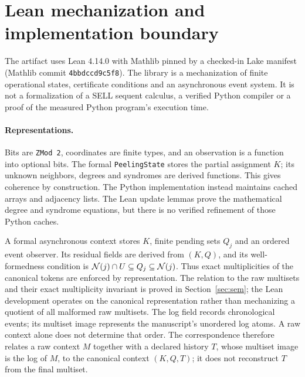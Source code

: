 \section{Lean mechanization and implementation boundary}\label{sec:lean}
The artifact uses Lean 4.14.0 with Mathlib pinned by a checked-in Lake
manifest (Mathlib commit \texttt{4bbdccd9c5f8}). The library is a
mechanization of finite operational states, certificate conditions and
an asynchronous event system. It is not a formalization of a SELL
sequent calculus, a verified Python compiler or a proof of the measured
Python program's execution time.

\paragraph{Representations.}
Bits are \texttt{ZMod 2}, coordinates are finite types, and an
observation is a function into optional bits. The formal
\texttt{PeelingState} stores the partial assignment $K$; its unknown
neighbors, degrees and syndromes are derived functions. This gives
coherence by construction. The Python implementation instead maintains
cached arrays and adjacency lists. The Lean update lemmas prove the
mathematical degree and syndrome equations, but there is no verified
refinement of those Python caches.

A formal asynchronous context stores $K$, finite pending sets $Q_j$
and an ordered event observer. Its residual fields are derived from
$(K,Q)$, and its well-formedness condition is
$\mathcal{N}(j)\cap U\subseteq Q_j\subseteq\mathcal{N}(j)$. Thus exact multiplicities
of the canonical tokens are enforced by representation. The relation
to the raw multisets and their exact multiplicity invariant is proved
in Section~\ref{sec:sem}; the Lean development operates on the
canonical representation rather than mechanizing a quotient of all
malformed raw multisets. The log field records chronological events;
its multiset image represents the manuscript's unordered log atoms.
A raw context alone does not determine that order. The correspondence
therefore relates a raw context $M$ together with a declared history
$T$, whose multiset image is the log of $M$, to the canonical context
$(K,Q,T)$; it does not reconstruct $T$ from the final multiset.


